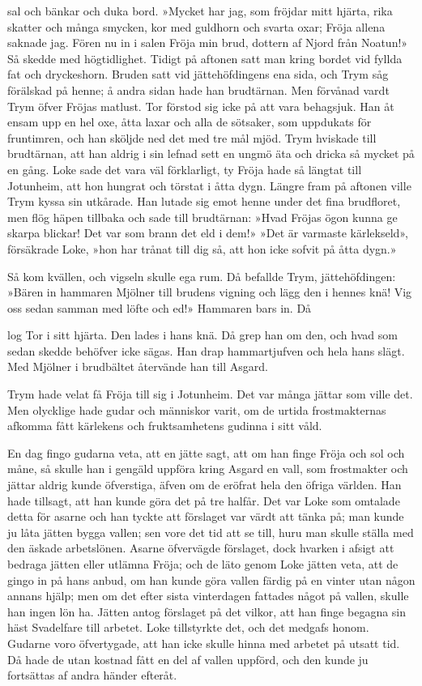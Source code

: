sal och bänkar och duka bord. »Mycket har jag, som fröjdar mitt hjärta,
rika skatter och många smycken, kor med guldhorn och svarta oxar; Fröja
allena saknade jag. Fören nu in i salen Fröja min brud, dottern af Njord
från Noatun!» Så skedde med högtidlighet. Tidigt på aftonen satt man
kring bordet vid fyllda fat och dryckeshorn. Bruden satt vid
jättehöfdingens ena sida, och Trym såg förälskad på henne; å andra sidan
hade han brudtärnan. Men förvånad vardt Trym öfver Fröjas matlust. Tor
förstod sig icke på att vara behagsjuk. Han åt ensam upp en hel oxe,
åtta laxar och alla de sötsaker, som uppdukats för fruntimren, och han
sköljde ned det med tre mål mjöd. Trym hviskade till brudtärnan, att han
aldrig i sin lefnad sett en ungmö äta och dricka så mycket på en gång.
Loke sade det vara väl förklarligt, ty Fröja hade så längtat till
Jotunheim, att hon hungrat och törstat i åtta dygn. Längre fram på
aftonen ville Trym kyssa sin utkårade. Han lutade sig emot henne under
det fina brudfloret, men flög häpen tillbaka och sade till brudtärnan:
»Hvad Fröjas ögon kunna ge skarpa blickar! Det var som brann det eld i
dem!» »Det är varmaste kärlekseld», försäkrade Loke, »hon har trånat
till dig så, att hon icke sofvit på åtta dygn.»

Så kom kvällen, och vigseln skulle ega rum. Då befallde Trym,
jättehöfdingen: »Bären in hammaren Mjölner till brudens vigning och lägg
den i hennes knä! Vig oss sedan samman med löfte och ed!» Hammaren bars
in. Då

log Tor i sitt hjärta. Den lades i hans knä. Då grep han om den, och
hvad som sedan skedde behöfver icke sägas. Han drap hammartjufven och
hela hans slägt. Med Mjölner i brudbältet återvände han till Asgard.



Trym hade velat få Fröja till sig i Jotunheim. Det var många jättar som
ville det. Men olycklige hade gudar och människor varit, om de urtida
frostmakternas afkomma fått kärlekens och fruktsamhetens gudinna i sitt
våld.

En dag fingo gudarna veta, att en jätte sagt, att om han finge Fröja och
sol och måne, så skulle han i gengäld uppföra kring Asgard en vall, som
frostmakter och jättar aldrig kunde öfverstiga, äfven om de eröfrat hela
den öfriga världen. Han hade tillsagt, att han kunde göra det på tre
halfår. Det var Loke som omtalade detta för asarne och han tyckte att
förslaget var värdt att tänka på; man kunde ju låta jätten bygga vallen;
sen vore det tid att se till, huru man skulle ställa med den äskade
arbetslönen. Asarne öfvervägde förslaget, dock hvarken i afsigt att
bedraga jätten eller utlämna Fröja; och de läto genom Loke jätten veta,
att de gingo in på hans anbud, om han kunde göra vallen färdig på en
vinter utan någon annans hjälp; men om det efter sista vinterdagen
fattades något på vallen, skulle han ingen lön ha. Jätten antog
förslaget på det vilkor, att han finge begagna sin häst Svadelfare till
arbetet. Loke tillstyrkte det, och det medgafs honom. Gudarne voro
öfvertygade, att han icke skulle hinna med arbetet på utsatt tid. Då
hade de utan kostnad fått en del af vallen uppförd, och den kunde ju
fortsättas af andra händer efteråt.

